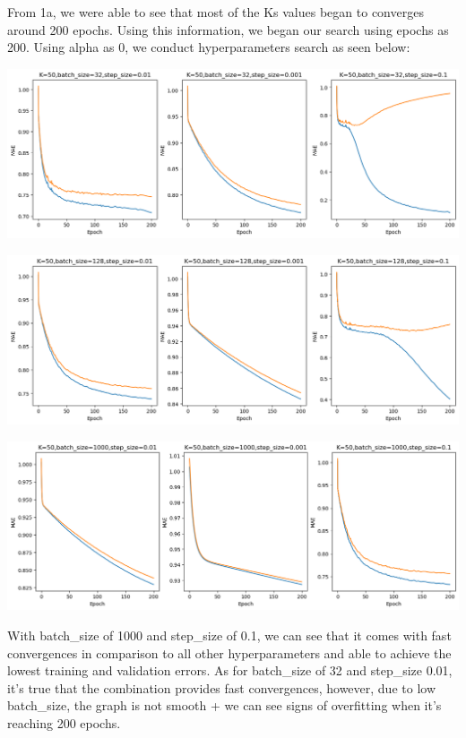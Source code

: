 \documentclass[a4paper]{article}
\begin{document}
From 1a, we were able to see that most of the Ks values began to converges
around 200 epochs. Using this information, we began our search using epochs as
200. Using alpha as 0, we conduct hyperparameters search as seen below:

\noindent\includegraphics[width=\textwidth]{../images/1b-k50-bs32.png}

\noindent\includegraphics[width=\textwidth]{../images/1b-k50-bs128.png}

\noindent\includegraphics[width=\textwidth]{../images/1b-k50-bs1000.png}

With batch\_size of 1000 and step\_size of 0.1, we can see that it comes with
fast convergences in comparison to all other hyperparameters and able to achieve
the lowest training and validation errors. As for batch\_size of 32 and
step\_size 0.01, it's true that the combination provides fast convergences,
however, due to low batch\_size, the graph is not smooth + we can see signs of
overfitting when it's reaching 200 epochs.
\end{document}
